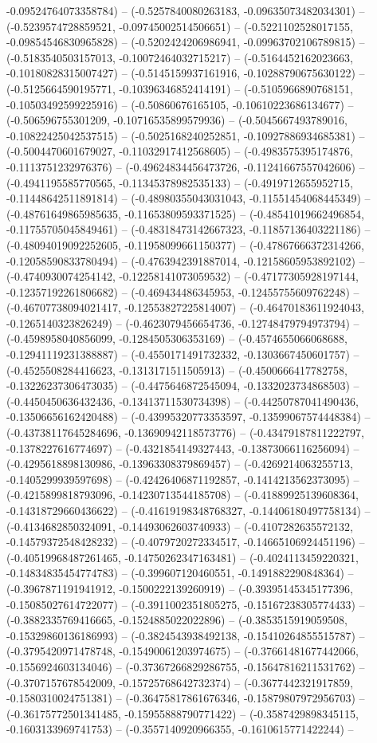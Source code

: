 -0.09524764073358784) -- (-0.5257840080263183, -0.09635073482034301) -- (-0.5239574728859521, -0.09745002514506651) -- (-0.5221102528017155, -0.09854546830965828) -- (-0.5202424206986941, -0.09963702106789815) -- (-0.5183540503157013, -0.10072464032715217) -- (-0.5164452162023663, -0.10180828315007427) -- (-0.5145159937161916, -0.10288790675630122) -- (-0.5125664590195771, -0.10396346852414191) -- (-0.5105966890768151, -0.10503492599225916) -- (-0.50860676165105, -0.10610223686134677) -- (-0.506596755301209, -0.10716535899579936) -- (-0.5045667493789016, -0.10822425042537515) -- (-0.5025168240252851, -0.10927886934685381) -- (-0.5004470601679027, -0.11032917412568605) -- (-0.4983575395174876, -0.1113751232976376) -- (-0.49624834456473726, -0.11241667557042606) -- (-0.4941195585770565, -0.11345378982535133) -- (-0.4919712655952715, -0.11448642511891814) -- (-0.48980355043031043, -0.11551454068445349) -- (-0.48761649865985635, -0.11653809593371525) -- (-0.48541019662496854, -0.11755705045849461) -- (-0.48318473142667323, -0.11857136403221186) -- (-0.48094019092252605, -0.11958099661150377) -- (-0.47867666372314266, -0.12058590833780494) -- (-0.4763942391887014, -0.12158605953892102) -- (-0.4740930074254142, -0.12258141073059532) -- (-0.47177305928197144, -0.12357192261806682) -- (-0.469434486345953, -0.12455755609762248) -- (-0.46707738094021417, -0.12553827225814007) -- (-0.46470183611924043, -0.1265140323826249) -- (-0.4623079456654736, -0.12748479794973794) -- (-0.4598958040856099, -0.1284505306353169) -- (-0.4574655066068688, -0.12941119231388887) -- (-0.4550171491732332, -0.1303667450601757) -- (-0.4525508284416623, -0.1313171511505913) -- (-0.4500666417782758, -0.13226237306473035) -- (-0.4475646872545094, -0.1332023734868503) -- (-0.4450450636432436, -0.13413711530734398) -- (-0.44250787041490436, -0.13506656162420488) -- (-0.43995320773353597, -0.13599067574448384) -- (-0.43738117645284696, -0.13690942118573776) -- (-0.43479187811222797, -0.1378227616774697) -- (-0.4321854149327443, -0.13873066116256094) -- (-0.4295618898130986, -0.13963308379869457) -- (-0.4269214063255713, -0.1405299939597698) -- (-0.42426406871192857, -0.1414213562373095) -- (-0.4215899818793096, -0.14230713544185708) -- (-0.41889925139608364, -0.14318729660436622) -- (-0.41619198348768327, -0.14406180497758134) -- (-0.4134682850324091, -0.14493062603740933) -- (-0.4107282635572132, -0.14579372548428232) -- (-0.4079720272334517, -0.14665106924451196) -- (-0.40519968487261465, -0.14750262347163481) -- (-0.4024113459220321, -0.14834835454774783) -- (-0.399607120460551, -0.1491882290848364) -- (-0.3967871191941912, -0.1500222139260919) -- (-0.39395145345177396, -0.15085027614722077) -- (-0.3911002351805275, -0.15167238305774433) -- (-0.3882335769416665, -0.1524885022022896) -- (-0.3853515919059508, -0.15329860136186993) -- (-0.3824543938492138, -0.15410264855515787) -- (-0.3795420971478748, -0.15490061203974675) -- (-0.37661481677442066, -0.1556924603134046) -- (-0.37367266829286755, -0.15647816211531762) -- (-0.3707157678542009, -0.15725768642732374) -- (-0.3677442321917859, -0.1580310024751381) -- (-0.36475817861676346, -0.15879807972956703) -- (-0.36175772501341485, -0.15955888790771422) -- (-0.3587429898345115, -0.1603133969741753) -- (-0.3557140920966355, -0.1610615771422244) -- 